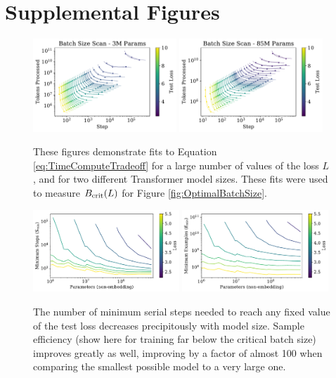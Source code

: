 \documentclass[english]{article}
\begin{document}
\section{Supplemental  Figures}

\begin{figure}
\noindent \centering{} 
\includegraphics[width=0.48\textwidth]{BatchParetoFronts3M} 
\includegraphics[width=0.48\textwidth]{BatchParetoFronts85M}
 \caption[Batch size scans]{These figures demonstrate fits to Equation \eqref{eq:TimeComputeTradeoff} for a large number of values of the loss $L$, and for two different Transformer model sizes.  These fits were used to measure $B_{\rm crit}(L)$ for Figure \ref{fig:OptimalBatchSize}.  \label{fig:BatchPareto}}
\end{figure}

\begin{figure}
\noindent \centering{}
\includegraphics[width=0.49\textwidth]{SampleEfficiencystep_min}
\includegraphics[width=0.49\textwidth]{SampleEfficiencyexamples_min}
\caption[Another look at sample efficiency]{The number of minimum serial steps needed to reach any fixed value of the test loss decreases precipitously with model size.  Sample efficiency (show here for training far below the critical batch size) improves greatly as well, improving by a factor of almost 100 when comparing the smallest possible model to a very large one.   \label{fig:SampleEfficiency}}
\end{figure} 
\end{document}
